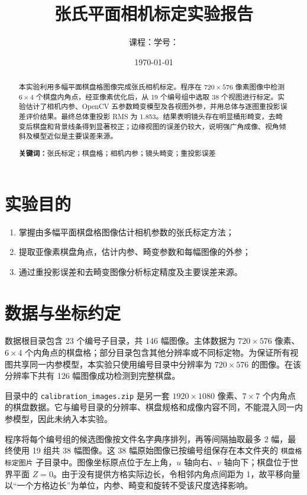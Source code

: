 \documentclass[UTF8,a4paper,12pt]{ctexart}
\title{张氏平面相机标定实验报告}
\author{课程：\CourseName\qquad \StudentName\quad 学号：\StudentID}
\date{\today}
\begin{document}
\maketitle
\thispagestyle{empty}

\begin{abstract}
本实验利用多幅平面棋盘格图像完成张氏相机标定。程序在 $720\times576$ 像素图像中检测 $6\times4$ 个棋盘内角点，经亚像素优化后，从 19 个编号组中选取 38 个视图进行标定。实验估计了相机内参、OpenCV 五参数畸变模型及各视图外参，并用总体与逐图重投影误差评价结果。最终总体重投影 RMS 为 \SI{1.853}{\pixel}。结果表明镜头存在明显桶形畸变，去畸变后棋盘和背景线条得到显著校正；边缘视图的误差仍较大，说明强广角成像、视角倾斜及模型近似是主要误差来源。

\textbf{关键词：}张氏标定；棋盘格；相机内参；镜头畸变；重投影误差
\end{abstract}

\clearpage
\tableofcontents
\clearpage

\section{实验目的}

\begin{enumerate}
  \item 掌握由多幅平面棋盘格图像估计相机参数的张氏标定方法；
  \item 提取亚像素棋盘角点，估计内参、畸变参数和每幅图像的外参；
  \item 通过重投影误差和去畸变图像分析标定精度及主要误差来源。
\end{enumerate}

\section{数据与坐标约定}

数据根目录包含 23 个编号子目录，共 146 幅图像。主体数据为 $720\times576$ 像素、$6\times4$ 个内角点的棋盘格；部分目录包含其他分辨率或不同标定物。为保证所有视图共享同一内参模型，本实验只使用编号目录中分辨率为 $720\times576$ 的图像。在该分辨率下共有 126 幅图像成功检测到完整棋盘。

目录中的 \texttt{calibration\_images.zip} 是另一套 $1920\times1080$ 像素、$7\times7$ 个内角点的棋盘数据。它与编号目录的分辨率、棋盘规格和成像内容不同，不能混入同一内参模型，因此未纳入本实验。

程序将每个编号组的候选图像按文件名字典序排列，再等间隔抽取最多 2 幅，最终使用 19 组共 38 幅图像。这 38 幅原始图像已按编号组保存在本文件夹的 \texttt{棋盘格标定图片} 子目录中。图像坐标原点位于左上角，$u$ 轴向右、$v$ 轴向下；棋盘位于世界平面 $Z=0$。由于没有提供方格实际边长，令相邻内角点间距为 1，故平移向量以“一个方格边长”为单位，内参、畸变和旋转不受该尺度选择影响。
\end{document}
